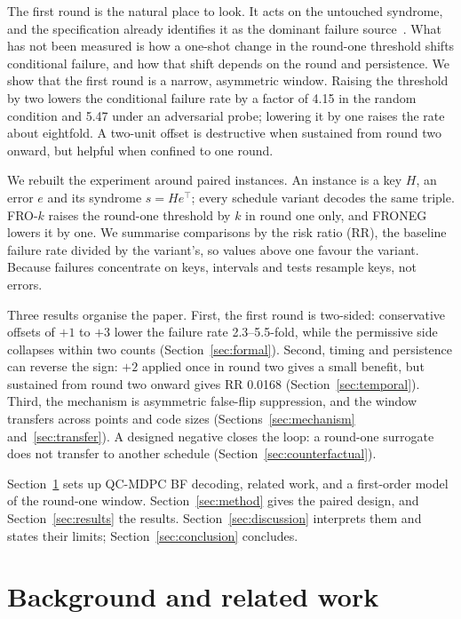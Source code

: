 \documentclass[letterpaper,journal]{IEEEtran}
\begin{document}
The first round is the natural place to look. It acts on the untouched syndrome, and the specification already identifies it as the dominant failure source~\cite{bike2024spec}. What has not been measured is how a one-shot change in the round-one threshold shifts conditional failure, and how that shift depends on the round and persistence. We show that the first round is a narrow, asymmetric window. Raising the threshold by two lowers the conditional failure rate by a factor of 4.15 in the random condition and 5.47 under an adversarial probe; lowering it by one raises the rate about eightfold. A two-unit offset is destructive when sustained from round two onward, but helpful when confined to one round.

We rebuilt the experiment around paired instances. An instance is a key $H$, an error $e$ and its syndrome $s=He^{\top}$; every schedule variant decodes the same triple. FRO-$k$ raises the round-one threshold by $k$ in round one only, and FRONEG lowers it by one. We summarise comparisons by the risk ratio (RR), the baseline failure rate divided by the variant's, so values above one favour the variant. Because failures concentrate on keys, intervals and tests resample keys, not errors.

Three results organise the paper. First, the first round is two-sided: conservative offsets of $+1$ to $+3$ lower the failure rate 2.3--5.5-fold, while the permissive side collapses within two counts (Section~\ref{sec:formal}). Second, timing and persistence can reverse the sign: $+2$ applied once in round two gives a small benefit, but sustained from round two onward gives RR 0.0168 (Section~\ref{sec:temporal}). Third, the mechanism is asymmetric false-flip suppression, and the window transfers across points and code sizes (Sections~\ref{sec:mechanism} and~\ref{sec:transfer}). A designed negative closes the loop: a round-one surrogate does not transfer to another schedule (Section~\ref{sec:counterfactual}).

Section~\ref{sec:background} sets up QC-MDPC BF decoding, related work, and a first-order model of the round-one window. Section~\ref{sec:method} gives the paired design, and Section~\ref{sec:results} the results. Section~\ref{sec:discussion} interprets them and states their limits; Section~\ref{sec:conclusion} concludes.
\section{Background and related work}\label{sec:background}
\end{document}
